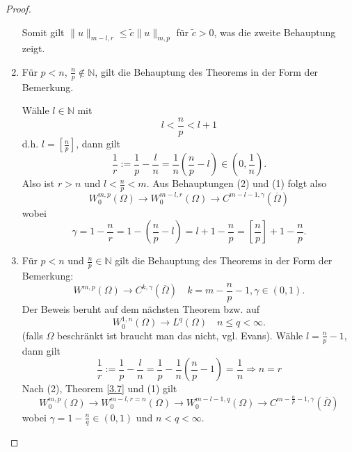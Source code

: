 \documentclass[
paper=a4,
bibtotocnumbered,
liststotocnumbered,
tablecaptionabove,
pointlessnumbers,
twoside,
openright,
10pt
]
{report}
\theoremstyle{definition}
\numberwithin{equation}{chapter}
\begin{document}
\begin{proof}
\begin{enumerate}
		Somit gilt $\|u\|_{m-l, r} \le \tilde c \| u\|_{m,p}$ für $\tilde c>0$, was die zweite Behauptung zeigt.
		
	\item Für $p<n$, $\frac{n}{p} \not\in \mathbb N$, gilt die Behauptung des Theorems in der Form der Bemerkung.
	
			Wähle $l\in \mathbb N$ mit
			\begin{equation}
				l < \frac{n}{p} < l+1
			\end{equation}
			d.h. $l= \left [ \frac{n}{p}\right ]$, dann gilt
			\begin{equation}
			\frac{1}{r} := \frac{1}{p} - \frac{l}{n} = \frac{1}{n} \left ( \frac{n}{p} -l\right ) \in \left(0, \frac{1}{n}\right).
			\end{equation}
			Also ist $r>n$ und $l < \frac{n}{p} <m$. Aus Behauptungen (2) und (1) folgt also
			\begin{equation}
				W_0^{m,p}(\Omega) \to W_0^{m-l,r}(\Omega) \to C^{m-l-1, \gamma}(\overline{\Omega})
			\end{equation}
			wobei 
			\begin{equation}
				\gamma = 1-\frac{n}{r} = 1-(\frac{n}{p}-l) = l+1 - \frac{n}{p} = [\frac{n}{p}] + 1 - \frac{n}{p}.
			\end{equation}
 		
 	\item Für $p <n$ und $\frac{n}{p} \in \mathbb N$ gilt die Behauptung des Theorems in der Form der Bemerkung:
 		\begin{equation}
 		W^{m,p}(\Omega) \to C^{k,\gamma}(\overline{\Omega}) \quad k=m-\frac{n}{p} -1, \gamma \in (0,1).
 		\end{equation}
 		Der Beweis beruht auf dem nächsten Theorem bzw. auf
 		\begin{equation}
 			W_0^{1,n}(\Omega) \to L^q(\Omega) \quad n \le q <\infty.
 		\end{equation}
 		(falls $\Omega$ beschränkt ist braucht man das nicht, vgl. Evans). Wähle $l=\frac{n}{p}-1$, dann gilt
		\begin{equation}
			\frac{1}{r} := \frac{1}{p} - \frac{l}{n} = \frac{1}{p} - \frac{1}{n} \left ( \frac{n}{p} -1 \right ) = \frac{1}{n} \Rightarrow n = r
		\end{equation}
		 Nach (2), Theorem \ref{3.7} und (1) gilt
		\begin{equation}
			W_0^{m,p}(\Omega) \to W_0^{m-l,r=n}(\Omega)\to W_0^{m-l-1,q}(\Omega) \to C^{m-\frac{n}{p}-1, \gamma} (\overline \Omega)
		\end{equation}
		wobei $\gamma = 1- \frac{n}{q} \in (0,1)$ und $n<q<\infty$.
 \end{enumerate}
 \end{proof}
\end{document}
